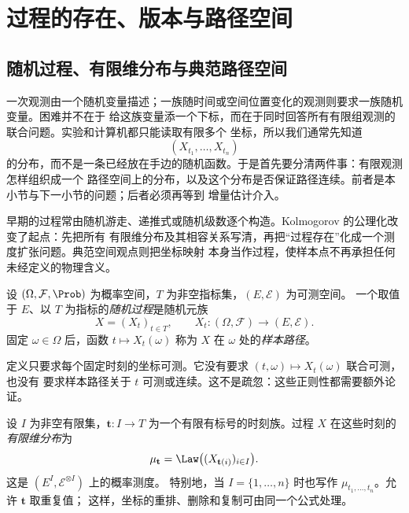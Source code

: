 \section{过程的存在、版本与路径空间}\label{sec:06-01}

\subsection{随机过程、有限维分布与典范路径空间}\label{subsec:6-1-1}

一次观测由一个随机变量描述；一族随时间或空间位置变化的观测则要求一族随机变量。困难并不在于
给这族变量添一个下标，而在于同时回答所有有限组观测的联合问题。实验和计算机都只能读取有限多个
坐标，所以我们通常先知道
\[
  (X_{t_1},\ldots,X_{t_n})
\]
的分布，而不是一条已经放在手边的随机函数。于是首先要分清两件事：有限观测怎样组织成一个
路径空间上的分布，以及这个分布是否保证路径连续。前者是本小节与下一小节的问题；后者必须再等到
增量估计介入。

早期的过程常由随机游走、递推式或随机级数逐个构造。Kolmogorov 的公理化改变了起点：先把所有
有限维分布及其相容关系写清，再把“过程存在”化成一个测度扩张问题。典范空间观点则把坐标映射
本身当作过程，使样本点不再承担任何未经定义的物理含义。

\begin{definition}[随机过程]\label{def:6-1-1-1}
设 $(\Omega,\mathcal F,\Prob)$ 为概率空间，$T$ 为非空指标集，$(E,\mathcal E)$ 为可测空间。
一个取值于 $E$、以 $T$ 为指标的\emph{随机过程}是随机元族
\[
  X=(X_t)_{t\in T},\qquad X_t:(\Omega,\mathcal F)\longrightarrow(E,\mathcal E).
\]
固定 $\omega\in\Omega$ 后，函数 $t\mapsto X_t(\omega)$ 称为 $X$ 在 $\omega$ 处的\emph{样本路径}。
\end{definition}

定义只要求每个固定时刻的坐标可测。它没有要求 $(t,\omega)\mapsto X_t(\omega)$ 联合可测，也没有
要求样本路径关于 $t$ 可测或连续。这不是疏忽：这些正则性都需要额外论证。

\begin{definition}[有限维分布]\label{def:6-1-1-2}
设 $I$ 为非空有限集，$\mathbf t:I\to T$ 为一个有限有标号的时刻族。过程 $X$ 在这些时刻的
\emph{有限维分布}为
\[
  \mu_{\mathbf t}
  =\Law\bigl((X_{\mathbf t(i)})_{i\in I}\bigr).
\]
这是 $(E^I,\mathcal E^{\otimes I})$ 上的概率测度。
特别地，当 $I=\{1,\ldots,n\}$ 时也写作 $\mu_{t_1,\ldots,t_n}$。允许 $\mathbf t$ 取重复值；
这样，坐标的重排、删除和复制可由同一个公式处理。
\end{definition}

